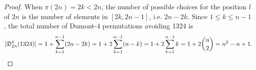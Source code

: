 \documentclass[
final
]{dmtcs-episciences}
\theoremstyle{definition}
\theoremstyle{remark}
\begin{document}
\begin{proof}

%
%
%
%
%
%


When $\pi(2n)=2k<2n$, the number of possible choices for the position $l$ of $2n$ is the number of elements in $[2k,2n-1]$, i.e. $2n-2k$. Since $1\le k\le n-1$, the total number of Dumont-4 permutations avoiding 1324 is
\[
|\mathfrak{D}^4_{2n}(1324)| = 1 + \sum_{k=1}^{n-1}(2n-2k)
= 1 + 2\sum_{k=1}^{n-1}(n-k)
= 1 + 2\sum_{k=1}^{n-1}k
= 1+ 2 \binom {n}{2}
= n^2-n+1. \qedhere
\]
\end{proof}
\end{document}
